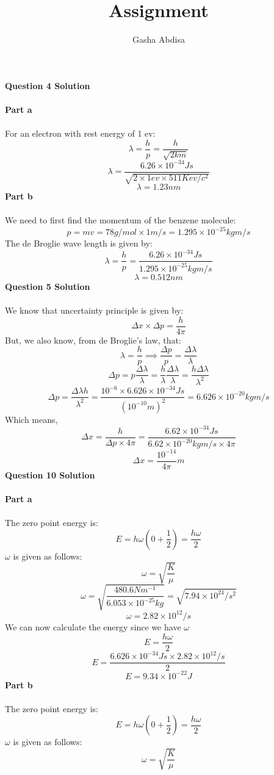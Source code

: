 \documentclass[9pt,addpoints]{exam}
\author{Gasha Abdisa}
\begin{document}
	\title{Assignment}
	\maketitle
	\textbf{Question 4 Solution}\\ \\
	\textbf{Part a} \\ \\
	For an electron with rest energy of 1 ev:
	$$\lambda=\dfrac{h}{p}=\dfrac{h}{\sqrt{2km}}$$
	$$\lambda=\dfrac{6.26\times10^{-34}Js}{\sqrt{2\times1ev\times511Kev/c^2}}$$
	$$\lambda=1.23nm$$
	\textbf{Part b} \\ \\
	We need to first find the momentum of the benzene molecule:
	$$p=mv=78g/mol\times1m/s=1.295\times10^{-25}kgm/s$$
	The de Broglie wave length is given by:
	$$\lambda=\dfrac{h}{p}=\dfrac{6.26\times10^{-34}Js}{1.295\times10^{-25}kgm/s}$$
	$$\lambda=0.512nm$$
	\textbf{Question 5 Solution}\\ \\
	We know that uncertainty principle is given by:
	$$\Delta x\times\Delta p=\dfrac{h}{4\pi}$$
	But, we also know, from de Broglie's law, that:
	$$\lambda=\dfrac{h}{p}\implies \dfrac{\Delta p}{p}=\dfrac{\Delta\lambda}{\lambda}$$
	$$\Delta p=p\dfrac{\Delta\lambda}{\lambda}=\dfrac{h}{\lambda}\dfrac{\Delta\lambda}{\lambda}=\dfrac{h\Delta\lambda}{\lambda^2}$$
	$$\Delta p=\dfrac{\Delta\lambda h}{\lambda^2}=\dfrac{10^{-6}\times6.626\times10^{-34}Js}{(10^{-10}m)^2}=6.626\times10^{-20}kgm/s$$
	Which means,
	$$\Delta x=\dfrac{h}{\Delta p\times4\pi}=\dfrac{6.62\times10^{-34}Js}{6.62\times10^{-20}kgm/s\times4\pi}$$
	$$\Delta x=\dfrac{10^{-14}}{4\pi}m$$
	\textbf{Question 10 Solution}\\ \\	
	\textbf{Part a} \\ \\
	The zero point energy is:
	$$E=h\omega(0+\frac{1}{2})=\dfrac{h\omega}{2}$$
	$\omega$ is given as follows:
	$$\omega=\sqrt{\dfrac{K}{\mu}}$$
	$$\omega=\sqrt{\dfrac{480.6Nm^{-1}}{6.053\times10^{-25}kg}}=\sqrt{7.94\times10^{24}/s^2}$$
	$$\omega=2.82\times10^{12}/s$$
	We can now calculate the energy since we have $\omega$
	$$E=\dfrac{h\omega}{2}$$
	$$E=\dfrac{6.626\times10^{-34}Js\times2.82\times10^{12}/s}{2}$$
	$$E=9.34\times10^{-22}J$$
	\textbf{Part b} \\ \\
	The zero point energy is:
	$$E=h\omega(0+\frac{1}{2})=\dfrac{h\omega}{2}$$
	$\omega$ is given as follows:
	$$\omega=\sqrt{\dfrac{K}{\mu}}$$
\end{document}
